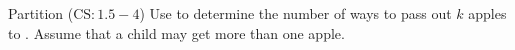 
% 
% 

\begin{frame}{}
  \begin{exampleblock}{Partition ($\text{CS}: 1.5-4$)}
    Use  to determine the number of ways to pass out $k$  apples to . 
    Assume that a child may get more than one apple.
  \end{exampleblock}
\end{frame}

